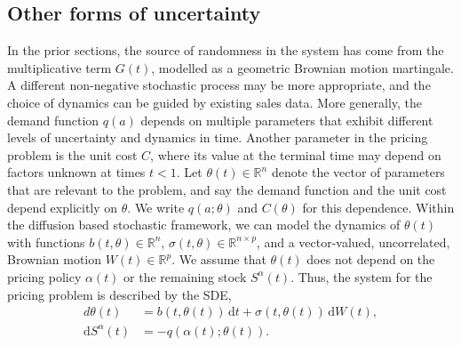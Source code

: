 \documentclass[main.tex]{subfiles}
\begin{document}
\subsection{Other forms of uncertainty}
In the prior sections, the source of randomness in the system has come from
the multiplicative term $G(t)$, modelled as a geometric Brownian
motion martingale. A different non-negative stochastic process may be more appropriate, and the
choice of dynamics can be guided by existing sales data.
More generally, the demand function $q(a)$ depends on multiple
parameters that exhibit different levels of
uncertainty and dynamics in time. Another parameter in the pricing
problem is the unit cost $C$, where its value at the terminal time may
depend on factors unknown at times $t<1$.
Let $\theta(t)\in\mathbb R^n$ denote the vector of parameters that are
relevant to the problem, and say the demand function  and the unit cost
depend explicitly on $\theta$. We write $q(a;\theta)$ and $C(\theta)$
for this dependence.
Within the diffusion based stochastic framework, we can model the
dynamics of $\theta(t)$ with functions $b(t,\theta)\in\mathbb R^n$,
$\sigma(t,\theta)\in\mathbb R^{n\times p}$, and a vector-valued, uncorrelated,
Brownian motion $W(t)\in\mathbb R^p$.
We assume that $\theta(t)$ does not depend on the pricing policy
$\alpha(t)$ or the remaining
stock $S^\alpha(t)$. Thus,
the system for the pricing problem is described by the SDE,
\begin{align}
  d\theta(t)&=b(t,\theta(t))\,\mathrm{d}t + \sigma(t,\theta(t))\,\mathrm{d}W(t),\\
  \mathrm{d}S^\alpha(t)&=-q(\alpha(t);\theta(t)).
\end{align}
\end{document}
